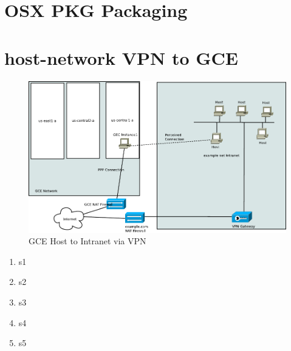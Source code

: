 \section{OSX PKG  Packaging}

\section{host-network VPN to GCE}
\begin{figure}[H]
\caption{GCE Host to Intranet via VPN}
\label{fig:GCE-Host-to-Intranet-via-VPN-OSX}
\begin{center}
\includegraphics[scale=0.65]{dia/gce-host-network-vpn.pdf}
\end{center}
\end{figure}

\begin{enumerate}
\item s1
\item s2
\item s3
\item s4
\item s5
\end{enumerate}
